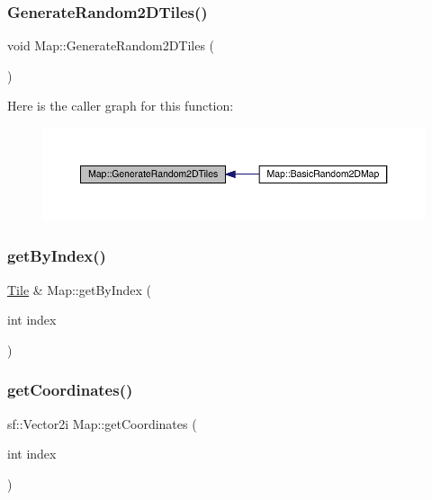 \subsubsection{\texorpdfstring{Generate\+Random2\+D\+Tiles()}{GenerateRandom2DTiles()}}
{\footnotesize\ttfamily void Map\+::\+Generate\+Random2\+D\+Tiles (\begin{DoxyParamCaption}{ }\end{DoxyParamCaption})}

Here is the caller graph for this function\+:
\nopagebreak
\begin{figure}[H]
\begin{center}
\leavevmode
\includegraphics[width=350pt]{dd/d11/class_map_a9fe61ffc95d4fc4bed052ead1c06221a_icgraph}
\end{center}
\end{figure}
\mbox{\label{class_map_ae9cd08e70d2549c046acbfab085d421c}} 
\subsubsection{\texorpdfstring{get\+By\+Index()}{getByIndex()}}
{\footnotesize\ttfamily \mbox{\hyperlink{class_tile}{Tile}} \& Map\+::get\+By\+Index (\begin{DoxyParamCaption}\item[{int}]{index }\end{DoxyParamCaption})}

\mbox{\label{class_map_abe8292f2baef82f73130f79f6b94f965}} 
\subsubsection{\texorpdfstring{get\+Coordinates()}{getCoordinates()}}
{\footnotesize\ttfamily sf\+::\+Vector2i Map\+::get\+Coordinates (\begin{DoxyParamCaption}\item[{int}]{index }\end{DoxyParamCaption})}

